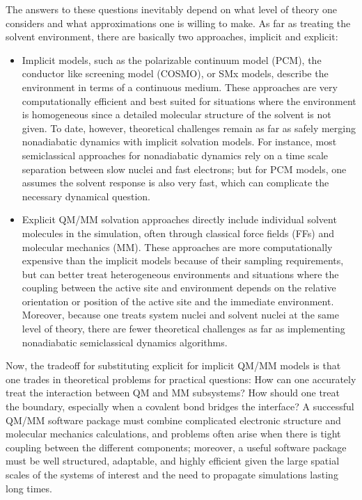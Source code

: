 \documentclass[journal=jctcce,manuscript=article,layout=traditional]{achemso}
\begin{document}
The answers to these questions inevitably depend on what level of theory one considers and what approximations one is willing to make. As far as treating the solvent environment, there are 
basically two approaches, implicit and explicit:
%
%
%
\begin{itemize}
\item Implicit models, such as the polarizable continuum model (PCM),\cite{Miertus1982,Mennucci2007,Mennucci:2012ct} the conductor like screening model (COSMO)\cite{Klamt_JCS_Cosmo,Pye1999TCA}, or SMx models,\cite{marenich_universal_2009,marenich_generalized_2013} describe the environment in terms of a continuous medium. 
These approaches are very computationally efficient and best suited for situations where the environment is homogeneous since a detailed molecular structure of the solvent is not given. To date, however, theoretical challenges remain as far as safely merging nonadiabatic dynamics with implicit solvation models. For instance, most semiclassical approaches for nonadiabatic dynamics rely on a time scale separation between slow nuclei and fast electrons; but for PCM models, one assumes the solvent response is also very fast, which can complicate the necessary dynamical question. 

\item Explicit QM/MM solvation approaches directly include individual solvent molecules in the simulation, often through classical force fields (FFs) and molecular mechanics (MM).
These approaches are more computationally expensive than the implicit models because of their sampling requirements, but can better treat heterogeneous environments and situations where the coupling between the active site and environment depends on the relative orientation or position of the active site and the immediate environment. Moreover, because one treats system nuclei and solvent nuclei at the same level of theory, there are fewer theoretical challenges as far as implementing nonadiabatic semiclassical dynamics algorithms. 
\end{itemize}

%
%
%
%
%
%
%
%
%
%
%
%
%


%
%
%
%
%


%
%
%


Now, the tradeoff for substituting explicit for implicit QM/MM models is that one trades in theoretical problems for practical questions:
How can one  accurately treat the interaction between QM and MM subsystems\cite{Warshel1976, Maseras1995, Svensson1996, Dapprich1999, Morokuma2006, Lin2006, Groenhof2013, Loco:2016bz, Curutchet2017}?
How should one treat the boundary, especially when a covalent bond bridges the interface\cite{Lin2005, Zhang2007, Boulanger:2012gx}?
A successful QM/MM software package must combine complicated electronic structure and molecular mechanics calculations, and problems often arise when there is tight coupling between the different components; moreover, a useful software package must be well structured, adaptable, and highly efficient given the large spatial scales of the systems of interest and the need to propagate simulations lasting long times.
\end{document}
